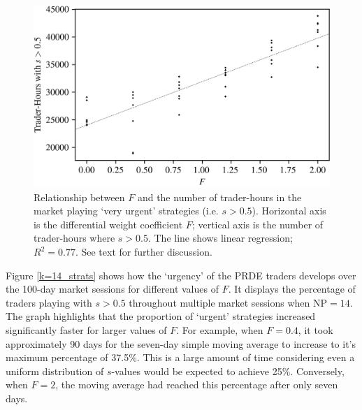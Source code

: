 \documentclass[conference]{IEEEtran}
\begin{document}
\begin{figure}[htbp]
    \centerline{\includegraphics[width=\columnwidth]{F_strats.png}}
    \caption{
        Relationship between $F$ and the number of trader-hours in the market playing `very urgent' strategies (i.e. $s>0.5$).
        Horizontal axis is the differential weight coefficient $F$; vertical axis is the number of trader-hours where $s>0.5$.
        The line shows linear regression; $R^2=0.77$.
        See text for further discussion.
    }
    \label{F_strats}
\end{figure}

Figure \ref{k=14_strats} shows how the `urgency' of the PRDE traders develops over the 100-day market sessions for different values of $F$.
It displays the percentage of traders playing with $s>0.5$ throughout multiple market sessions when $\mathrm{NP}=14$.
The graph highlights that the proportion of `urgent' strategies increased significantly faster for larger values of $F$.
For example, when $F=0.4$, it took approximately 90 days for the seven-day simple moving average to increase to it's maximum percentage of 37.5\%.
This is a large amount of time considering even a uniform distribution of $s$-values would be expected to achieve 25\%.
Conversely, when $F=2$, the moving average had reached this percentage after only seven days.
\end{document}
